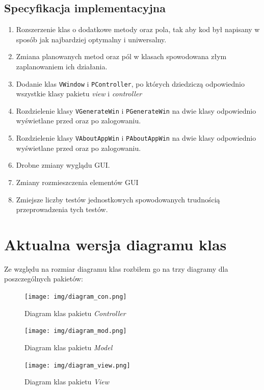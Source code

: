 \documentclass[a4paper]{article}
\newcommand{\prog}{\texttt}
\begin{document}
\subsection{Specyfikacja implementacyjna}
\begin{enumerate}
    \item Rozszerzenie klas o dodatkowe metody oraz pola, tak aby kod był napisany w sposób jak najbardziej optymalny i uniwersalny.
    \item Zmiana planowanych metod oraz pól w klasach spowodowana złym zaplanowaniem ich działania.
    \item Dodanie klas \prog{VWindow} i \prog{PController}, po których dziedziczą odpowiednio wszystkie klasy pakietu \textit{view} i \textit{controller}
    \item Rozdzielenie klasy \prog{VGenerateWin} i \prog{PGenerateWin} na dwie klasy odpowiednio wyświetlane przed oraz po zalogowaniu.
    \item Rozdzielenie klasy \prog{VAboutAppWin} i \prog{PAboutAppWin} na dwie klasy odpowiednio wyświetlane przed oraz po zalogowaniu.
    \item Drobne zmiany wyglądu GUI.
    \item Zmiany rozmieszczenia elementów GUI
    \item Zmiejsze liczby testów jednostkowych spowodowanych trudnością przeprowadzenia tych testów.
\end{enumerate}
\newpage

\section{Aktualna wersja diagramu klas}
Ze względu na rozmiar diagramu klas rozbiłem go na trzy diagramy dla poszczególnych pakietów:
\begin{figure}[H]
    \centering
    \texttt{[image: img/diagram\_con.png]}
    \caption{Diagram klas pakietu \textit{Controller}}
\end{figure}

\begin{figure}[H]
    \centering
    \texttt{[image: img/diagram\_mod.png]}
    \caption{Diagram klas pakietu \textit{Model}}
\end{figure}

\begin{figure}[H]
    \centering
    \texttt{[image: img/diagram\_view.png]}
    \caption{Diagram klas pakietu \textit{View}}
\end{figure}
\end{document}
